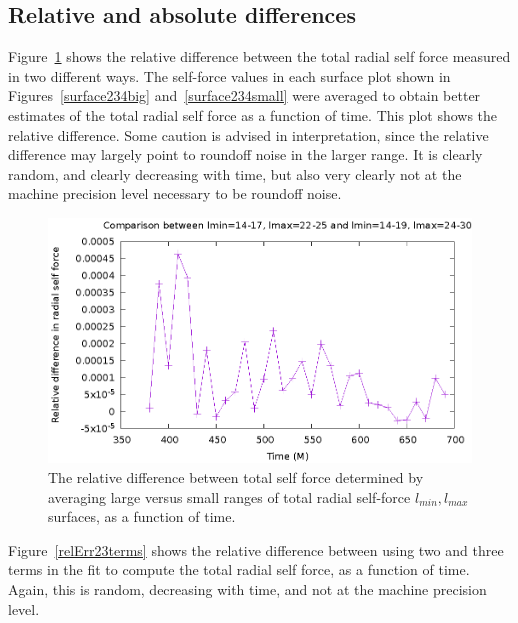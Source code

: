 \subsection{Relative and absolute differences}

Figure~\ref{relErrSelfForceBigSmall} shows the relative difference between the total radial self force measured in two different ways. The self-force values in each surface plot shown in Figures~\ref{surface234big} and~\ref{surface234small} were averaged to obtain better estimates of the total radial self force as a function of time. This plot shows the relative difference. Some caution is advised in interpretation, since the relative difference may largely point to roundoff noise in the larger range. It is clearly random, and clearly decreasing with time, but also very clearly not at the machine precision level necessary to be roundoff noise.


\begin{figure}
  \includegraphics{relErrBigSmallRangeOverTime.eps}
  \caption{The relative difference between total self force determined by averaging large versus small ranges of total radial self-force $l_{min},l_{max}$ surfaces, as a function of time.}
  \label{relErrSelfForceBigSmall}
\end{figure}


Figure~\ref{relErr23terms} shows the relative difference between using two and three terms in the fit to compute the total radial self force, as a function of time. Again, this is random, decreasing with time, and not at the machine precision level. 


